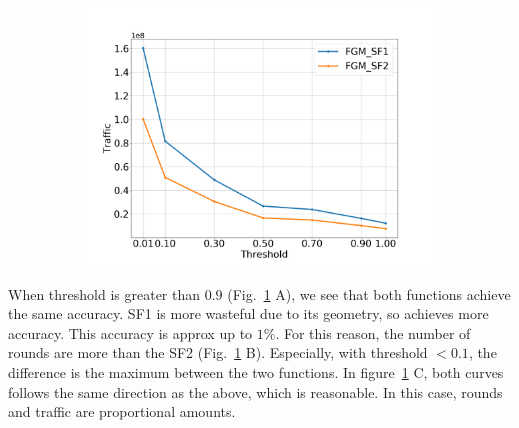 \begin{figure}[H]
\begin{subfigure}[b]{0.50\textwidth}
        \includegraphics[width=\textwidth]{./images/results/sf-comp/exp_Fig_1_3.png}
        \caption{}
    \end{subfigure}
    \caption{}
    \label{fig:sf_1}
\end{figure}

When threshold is greater than $0.9$ (Fig.~\ref{fig:sf_1} A), we see that both functions achieve the same accuracy.
SF1 is more wasteful due to its geometry, so achieves more accuracy.
This accuracy is approx up to $1\%$.
For this reason, the number of rounds are more than the SF2 (Fig.~\ref{fig:sf_1} B).
Especially, with threshold $< 0.1$, the difference is the maximum between the two functions.
In figure~\ref{fig:sf_1} C, both curves follows the same direction as the above, which is reasonable.
In this case, rounds and traffic are proportional amounts.

